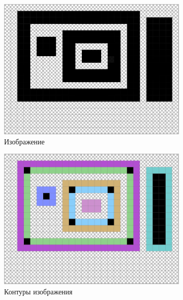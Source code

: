 \documentclass{fefu_thesis/cls/fefu}
\begin{document}
    \begin{figure}[H]
        \centering
        \begin{subfigure}[t]{.49\linewidth}
            \includegraphics[scale=0.4]{images/SuzukiExample_upscaled.png}
            \caption{Изображение}
        \end{subfigure}
        \begin{subfigure}[t]{.49\linewidth}
            \includegraphics[scale=0.4]{images/SuzukiExample_contours_upscaled.png}
            \caption{Контуры изображения}
        \end{subfigure}
        \begin{subfigure}[t]{.99\linewidth}
            \centering

\end{subfigure}
\end{figure}
\end{document}
